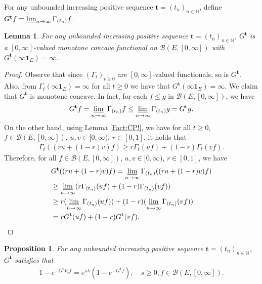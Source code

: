 \documentclass[12pt,a4paper]{amsart}
\numberwithin{equation}{section}
\theoremstyle{plain}
\newtheorem{lem}[thm]{Lemma}
\newtheorem{prop}[thm]{Proposition}
\theoremstyle{definition}
\theoremstyle{remark}
\newcounter{N}
\newcounter{n}[N]
\begin{document}
For any unbounded increasing positive sequence $\mathbf t = (t_n)_{n\in \mathbb N}$, define $G^\mathbf t f = \varliminf_{n\to \infty} \Gamma_{(t_n)} f$.
\begin{lem} \label{Lemma:Gta!}
For any unbounded increasing positive sequence $\mathbf t = (t_n)_{n\in \mathbb N}$, $G^\mathbf t$ is a $[0,\infty]$-valued monotone concave functional on $\mathcal B(E,[0,\infty])$ with $G^\mathbf t(\infty \mathbf 1_E) = \infty$.
\end{lem}
\begin{proof}
Observe that since $(\Gamma_t)_{t\geq 0}$ are $[0,\infty]$-valued functionals, so is $G^{\mathbf t}$.
Also, from $\Gamma_t(\infty \mathbf 1_E) = \infty$ for all $t\geq 0$ we have that $G^{\mathbf t}(\infty \mathbf 1_E) = \infty$.
We claim that $G^\mathbf t$ is monotone concave.
In fact, for each $f \leq g$ in $\mathcal B(E,[0,\infty])$, we have
\begin{align}
 G^{\mathbf t} f
 = \varliminf_{n\to \infty} \Gamma_{(t_n)} f
   \leq \varliminf_{n\to \infty} \Gamma_{(t_n)} g
  = G^{\mathbf t} g.
   \end{align}
On the other hand, using Lemma \ref{Fact:CP!}, we have for all $t\geq 0$, $f\in \mathcal B(E,[0,\infty])$, $u,v \in [0,\infty)$, $r\in [0,1]$, it holds that
\begin{align}
 \Gamma_t((ru+(1-r) v)f)
  \geq r \Gamma_t (uf) + (1-r) \Gamma_t (vf).
 \end{align}
Therefore, for all $f\in \mathcal B(E,[0,\infty])$, $u,v \in [0,\infty)$, $r \in [0,1]$, we have
\begin{align}
 & G^{\mathbf t}((ru + (1-r)v)f)
 = \varliminf_{n \to \infty} \Gamma_{(t_n)}((ru + (1-r)v)f)
 \\&\geq \varliminf_{n\to \infty} (r\Gamma_{(t_n)} (uf) + (1-r)\Gamma_{(t_n)}(vf))
 \\&\geq r (\varliminf_{n\to \infty} \Gamma_{(t_n)} (uf)) + (1-r) (\varliminf_{n\to \infty} \Gamma_{(t_n)}(vf) )
 \\&= r G^{\mathbf t} (uf) + (1-r) G^{\mathbf t}(vf). \qedhere
 \end{align}
\end{proof}
\begin{prop} \label{Proposition:Gtb:H1:H2:H3:H4}
For any unbounded increasing positive sequence $\mathbf t = (t_n)_{n\in \mathbb N}$, $G^\mathbf t$ satisfies that
\begin{align}
 1 - e^{-G^\mathbf t V_s f}
 = e^{s\lambda} (1-e^{- G^\mathbf t f}),
 \quad s\geq 0, f\in \mathcal B(E,[0,\infty]).
 \end{align}
\end{prop}
\end{document}
